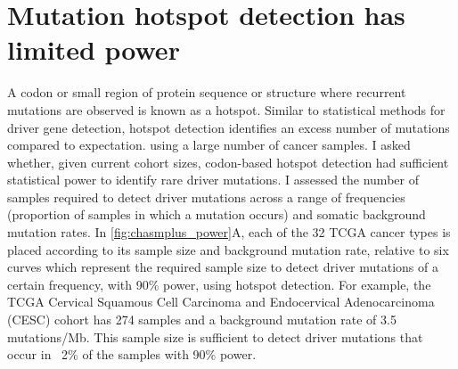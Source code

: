 \section{Mutation hotspot detection has limited power}
A codon or small region of protein sequence or structure where recurrent mutations are observed is known as a hotspot.  Similar to statistical methods for driver gene detection, hotspot detection identifies an excess number of mutations compared to expectation. using a large number of cancer samples.  I asked whether, given current cohort sizes, codon-based hotspot detection had sufficient statistical power to identify rare driver mutations.  I assessed the number of samples required to detect driver mutations across a range of frequencies (proportion of samples in which a mutation occurs) and somatic background mutation rates. In \autoref{fig:chasmplus_power}A, each of the 32 TCGA cancer types is placed according to its sample size and background mutation rate, relative to six curves which represent the required sample size to detect driver mutations of a certain frequency, with 90\% power, using hotspot detection.  For example, the TCGA Cervical Squamous Cell Carcinoma and Endocervical Adenocarcinoma (CESC) cohort has 274 samples and a background mutation rate of 3.5 mutations/Mb.  This sample size is sufficient to detect driver mutations that occur in ~2\% of the samples with 90\% power. 

